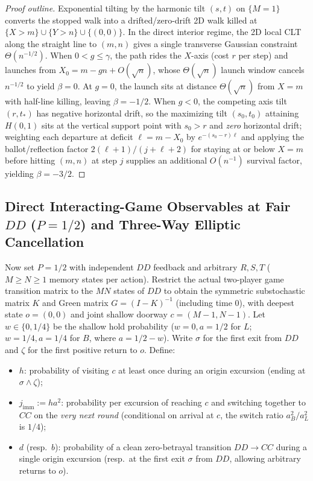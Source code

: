 \documentclass[11pt,reqno]{amsart}
\theoremstyle{definition}
\theoremstyle{remark}
\begin{document}
\begin{proof}[Proof outline]
Exponential tilting by the harmonic tilt $(s,t)$ on $\{M=1\}$ converts the stopped walk into a drifted/zero-drift 2D walk killed at $\{X>m\} \cup \{Y>n\} \cup \{(0,0)\}$. In the direct interior regime, the 2D local CLT along the straight line to $(m,n)$ gives a single transverse Gaussian constraint $\Theta(n^{-1/2})$. When $0 < g \le \gamma$, the path rides the $X$-axis (cost $r$ per step) and launches from $X_0 = m - g n + O(\sqrt{n})$, whose $\Theta(\sqrt{n})$ launch window cancels $n^{-1/2}$ to yield $\beta = 0$. At $g=0$, the launch sits at distance $\Theta(\sqrt{n})$ from $X=m$ with half-line killing, leaving $\beta = -1/2$. When $g < 0$, the competing axis tilt $(r, t_*)$ has negative horizontal drift, so the maximizing tilt $(s_0, t_0)$ attaining $H(0,1)$ sits at the vertical support point with $s_0 > r$ and \emph{zero} horizontal drift; weighting each departure at deficit $\ell = m - X_0$ by $e^{-(s_0-r)\ell}$ and applying the ballot/reflection factor $2(\ell+1)/(j+\ell+2)$ for staying at or below $X=m$ before hitting $(m,n)$ at step $j$ supplies an additional $O(n^{-1})$ survival factor, yielding $\beta = -3/2$.
\end{proof}

\subsection{Direct Interacting-Game Observables at Fair \texorpdfstring{$DD$ ($P=1/2$)}{DD (P=1/2)} and Three-Way Elliptic Cancellation}
Now set $P = 1/2$ with independent $DD$ feedback and arbitrary $R, S, T$ ($M \ge N \ge 1$ memory states per action). Restrict the actual two-player game transition matrix to the $MN$ states of $DD$ to obtain the symmetric substochastic matrix $K$ and Green matrix $G = (I - K)^{-1}$ (including time $0$), with deepest state $o = (0,0)$ and joint shallow doorway $c = (M-1, N-1)$. Let $w \in \{0, 1/4\}$ be the shallow hold probability ($w=0, a=1/2$ for $L$; $w=1/4, a=1/4$ for $B$, where $a = 1/2 - w$). Write $\sigma$ for the first exit from $DD$ and $\zeta$ for the first positive return to $o$. Define:
\begin{itemize}
  \item $h$: probability of visiting $c$ at least once during an origin excursion (ending at $\sigma \wedge \zeta$);
  \item $j_{\mathrm{imm}} := h a^2$: probability per excursion of reaching $c$ and switching together to $CC$ on the \emph{very next round} (conditional on arrival at $c$, the switch ratio $a_B^2/a_L^2$ is $1/4$);
  \item $d$ (resp.\ $b$): probability of a clean zero-betrayal transition $DD \to CC$ during a single origin excursion (resp.\ at the first exit $\sigma$ from $DD$, allowing arbitrary returns to $o$).
\end{itemize}
\end{document}
